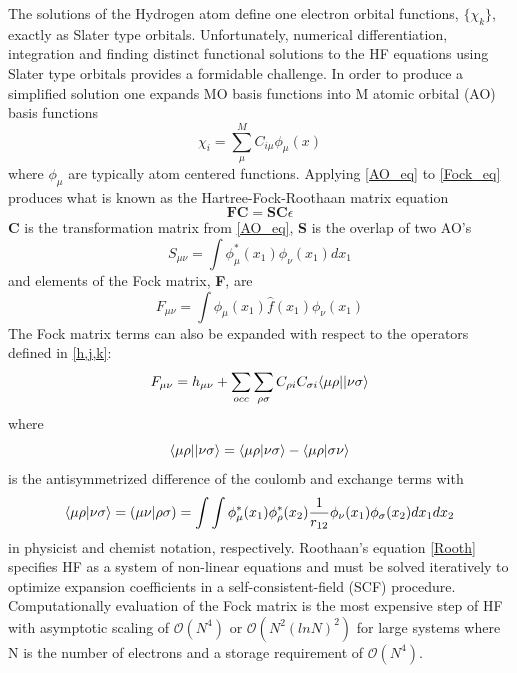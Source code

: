     The solutions of the Hydrogen atom define one electron orbital functions, $\{\chi_k\}$, exactly as Slater type orbitals. Unfortunately, numerical differentiation, integration and finding distinct functional solutions to the HF equations using Slater type orbitals provides a formidable challenge. In order to produce a simplified solution one expands MO basis functions into M atomic orbital (AO) basis functions
      \begin{equation} \label{AO_eq}
      \chi_i = \sum_\mu^M C_{i\mu} \phi_\mu(x)
      \end{equation}
    where $\phi_\mu$ are typically atom centered functions.  Applying \cref{AO_eq} to \cref{Fock_eq} produces what is known as the Hartree-Fock-Roothaan matrix equation\cite{Roothaan 1960,Roothaan 1951}
      \begin{equation} \label{Rooth}
      \textbf{FC} = \textbf{SC}\epsilon
      \end{equation}
    \textbf{C} is the transformation matrix from \cref{AO_eq}, \textbf{S} is the overlap of two AO's
      \begin{equation}
      S_{\mu\nu} = \int \phi^*_\mu(x_1) \phi_\nu(x_1) dx_1
      \end{equation}
    and elements of the Fock matrix, \textbf{F}, are
      \begin{equation}
      F_{\mu\nu} = \int \phi_\mu(x_1) \hat{f}(x_1) \phi_\nu(x_1) 
      \end{equation}
    The Fock matrix terms can also be expanded with respect to the operators defined in \cref{h,j,k}:
      \begin{equation}
      F_{\mu\nu} = h_{\mu\nu} + \sum_{occ}\sum_{\rho \sigma} C_{\rho i} C_{\sigma i} \langle\mu \rho || \nu \sigma \rangle
      \end{equation}
    where 
      \begin{equation}
      \langle\mu \rho || \nu \sigma \rangle = \langle\mu \rho|\nu \sigma\rangle - \langle\mu \rho|\sigma \nu\rangle
      \end{equation}
    is the antisymmetrized difference of the coulomb and exchange terms with 
      \begin{equation} \label{antisymm}
      \langle\mu \rho|\nu \sigma\rangle = (\mu \nu | \rho \sigma) = \int \int \phi^*_\mu(x_1) \phi^*_\rho(x_2) \frac{1}{r_{12}} \phi_\nu (x_1) \phi_\sigma(x_2) dx_1 dx_2
      \end{equation}
    in physicist and chemist notation, respectively. Roothaan's equation \cref{Rooth} specifies HF as a system of non-linear equations and must be solved iteratively to optimize expansion coefficients in a self-consistent-field (SCF) procedure. Computationally evaluation of the Fock matrix is the most expensive step of HF with asymptotic scaling of $\mathcal{O}(N^4)$ or $\mathcal{O}(N^2(lnN)^2)$ for large systems where N is the number of electrons and a storage requirement of $\mathcal{O}(N^4)$.  
